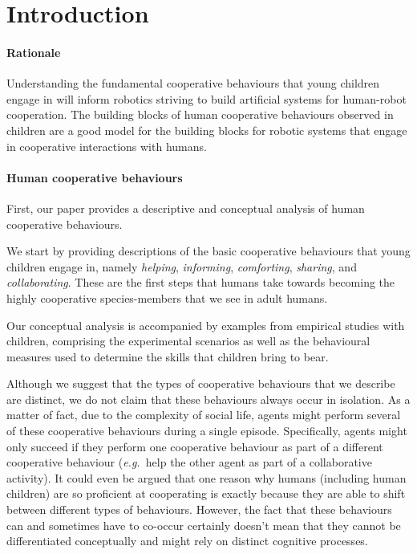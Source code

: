 \documentclass{article}
\newcommand{\eg}{{\textit{e.g.~}}}
\begin{document}
\section{Introduction}


\paragraph{Rationale} Understanding the fundamental cooperative behaviours that young
children engage in will inform robotics striving to build artificial systems
for human-robot cooperation. The building blocks of human cooperative behaviours
observed in children are a good model for the building blocks for robotic
systems that engage in cooperative interactions with humans.

\paragraph{Human cooperative behaviours} First, our paper provides a
descriptive and conceptual analysis of human cooperative behaviours.

We start by providing descriptions of the basic cooperative behaviours that young
children engage in, namely \emph{helping}, \emph{informing}, \emph{comforting},
\emph{sharing}, and \emph{collaborating}. These are the first steps that humans
take towards becoming the highly cooperative species-members that we see in
adult humans.

Our conceptual analysis is accompanied by examples from empirical studies with
children, comprising the experimental scenarios as well as the behavioural
measures used to determine the skills that children bring to bear.

Although we suggest that the types of cooperative behaviours that we
describe are distinct, we do not claim that these behaviours always occur in
isolation. As a matter of fact, due to the complexity of social life,
agents might perform several of these cooperative behaviours during a
single episode. Specifically, agents might only succeed if they perform one
cooperative behaviour as part of a different cooperative behaviour (\eg help
the other agent as part of a collaborative activity). It could even be
argued that one reason why humans (including human children) are so
proficient at cooperating is exactly because they are able to shift between
different types of behaviours. However, the fact that these behaviours can
and sometimes have to co-occur certainly doesn't mean that they cannot be
differentiated conceptually and might rely on distinct cognitive processes.
\end{document}
